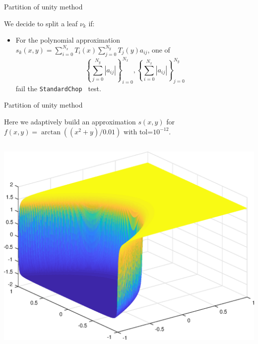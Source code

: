 \documentclass{beamer}
\newcommand{\lp}{\left(}
\newcommand{\rp}{\right)}
\begin{document}
\begin{frame}{Partition of unity method}
\begin{center}
We decide to split a leaf $\nu_k$ if:
\end{center}
\begin{itemize}
\item For the polynomial approximation $s_k(x,y)=\sum_{i=0}^{N_x} T_i(x) \sum_{j=0}^{N_y} T_j(y)a_{ij}$, one of $$ \left \{ \sum_{j=0}^{N_y} |a_{ij}|  \right \}_{i=0}^{N_x}, \left \{ \sum_{i=0}^{N_x} |a_{ij}|  \right \}_{j=0}^{N_y} $$ fail the { \tt StandardChop } test.
\end{itemize}

\end{frame}

\begin{frame}{Partition of unity method}

\begin{center}
Here we adaptively build an approximation $s(x,y)$ for $f(x,y) = \arctan \lp \lp x^2+y \rp/0.01 \rp$ with tol=$10^{-12}$.
\end{center}

\begin{columns}[t]

\begin{column}{0.5\textwidth}	
\begin{center}
\includegraphics[scale = 0.3]{tan2Dplot.eps}	
\end{center}
\end{column}


\end{columns}
\end{frame}
\end{document}
